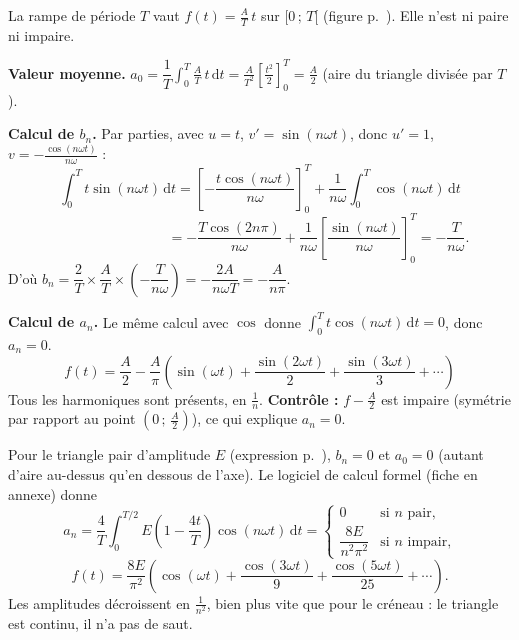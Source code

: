 \documentclass[a4paper,11pt]{article}
\begin{document}
\begin{appliindus}\label{ex:rampe}
La rampe de période $T$ vaut $f(t) = \frac{A}{T}\,t$ sur $[0\,;\,T[$ (figure p.~\pageref{ex:troissignaux}). Elle n'est ni paire ni impaire.

\textbf{Valeur moyenne.} $a_0 = \dfrac1T\displaystyle\int_0^T\frac AT\,t\,\mathrm dt = \frac{A}{T^2}\left[\frac{t^2}{2}\right]_0^T = \frac A2$ (aire du triangle divisée par $T$).

\textbf{Calcul de $b_n$.} Par parties, avec $u = t$, $v' = \sin(n\omega t)$, donc $u' = 1$, $v = -\frac{\cos(n\omega t)}{n\omega}$ :
\[
\int_0^T t\sin(n\omega t)\,\mathrm dt
= \left[-\frac{t\cos(n\omega t)}{n\omega}\right]_0^T + \frac{1}{n\omega}\int_0^T\cos(n\omega t)\,\mathrm dt
\]
\[
\phantom{\int_0^T t\sin(n\omega t)\,\mathrm dt}= -\frac{T\cos(2n\pi)}{n\omega} + \frac{1}{n\omega}\left[\frac{\sin(n\omega t)}{n\omega}\right]_0^T
= -\frac{T}{n\omega}.
\]
D'où $b_n = \dfrac2T\times\dfrac AT\times\left(-\dfrac{T}{n\omega}\right) = -\dfrac{2A}{n\omega T} = -\dfrac{A}{n\pi}$.

\textbf{Calcul de $a_n$.} Le même calcul avec $\cos$ donne $\int_0^T t\cos(n\omega t)\,\mathrm dt = 0$, donc $a_n = 0$.
\[
\boxed{f(t) = \frac A2 - \frac A\pi\left(\sin(\omega t) + \frac{\sin(2\omega t)}{2} + \frac{\sin(3\omega t)}{3} + \cdots\right)}
\]
Tous les harmoniques sont présents, en $\frac1n$. \textbf{Contrôle :} $f - \frac A2$ est impaire (symétrie par rapport au point $\left(0\,;\,\frac A2\right)$), ce qui explique $a_n = 0$.
\end{appliindus}

\begin{appliindus}\label{ex:triangle}
Pour le triangle pair d'amplitude $E$ (expression p.~\pageref{ex:triangleexpr}), $b_n = 0$ et $a_0 = 0$ (autant d'aire au-dessus qu'en dessous de l'axe). Le logiciel de calcul formel (fiche en annexe) donne
\[
a_n = \frac4T\int_0^{T/2}E\left(1-\frac{4t}{T}\right)\cos(n\omega t)\,\mathrm dt =
\begin{cases} 0 & \text{si } n \text{ pair,}\\[4pt] \dfrac{8E}{n^2\pi^2} & \text{si } n \text{ impair,}\end{cases}
\]
\[
f(t) = \frac{8E}{\pi^2}\left(\cos(\omega t) + \frac{\cos(3\omega t)}{9} + \frac{\cos(5\omega t)}{25} + \cdots\right).
\]
Les amplitudes décroissent en $\frac{1}{n^2}$, bien plus vite que pour le créneau : le triangle est continu, il n'a pas de saut.
\end{appliindus}
\end{document}
